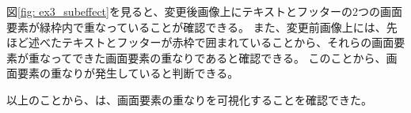 図\ref{fig: ex3_subeffect}を見ると、変更後画像上にテキストとフッターの2つの画面要素が緑枠内で重なっていることが確認できる。
また、変更前画像上には、先ほど述べたテキストとフッターが赤枠で囲まれていることから、それらの画面要素が重なってできた画面要素の重なりであると確認できる。
このことから、画面要素の重なりが発生していると判断できる。
\par
以上のことから、\toolName は、画面要素の重なりを可視化することを確認できた。









